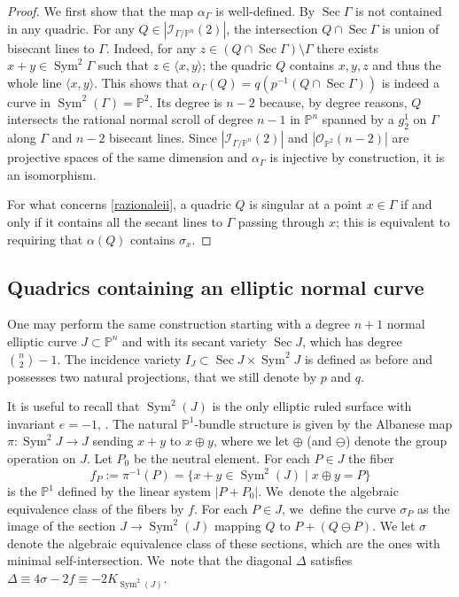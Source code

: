 \documentclass[JEP,XML,SOM,Unicode,NoEqCountersInSection,published]{cedram}
\theoremstyle{plain}
\theoremstyle{definition}
\DeclareMathOperator{\Sec}{Sec}
\DeclareMathOperator{\Sym}{Sym}
\newcommand\PP{{\mathbb P}}
\newcommand\I{{\mathcal I}}
\let\+\oplus
\begin{document}
\begin{proof}
We first show that the map $\alpha_\Gamma$ is well-defined. By \cite{Ca} $\Sec\Gamma$ is not contained in any quadric. For any $Q\in |\I_{\Gamma/\PP^n}(2)|$, the intersection $Q\cap \Sec\Gamma$ is union of bisecant lines to $\Gamma$. Indeed, for any $z\in (Q\cap \Sec \Gamma)\setminus \Gamma$ there exists $x+y\in \Sym^2\Gamma$ such that $z\in \langle x,y\rangle$; the quadric $Q$ contains $x,y,z$ and thus the whole line $\langle x,y\rangle$. This shows that $\alpha_\Gamma (Q)=q(p^{-1}(Q\cap\Sec \Gamma))$ is indeed a curve in $\Sym^2(\Gamma)=\PP^2$. Its degree is $n-2$ because, by degree reasons, $Q$ intersects the rational normal scroll of degree $n-1$ in $\PP^n$ spanned by a $g^1_2$ on $\Gamma$ along $\Gamma$ and $n-2$ bisecant lines. Since $|\I_{\Gamma/\PP^n}(2)|$ and $|\mathcal O_{\PP^2}(n-2)|$ are projective spaces of the same dimension and $\alpha_\Gamma$ is injective by construction, it is an isomorphism.

For what concerns \eqref{razionaleii}, a quadric $Q$ is singular at a point $x\in \Gamma$ if and only if it contains all the secant lines to $\Gamma$ passing through $x$; this is equivalent to requiring that $\alpha(Q)$ contains $\sigma _x$.
\end{proof}

\subsection{Quadrics containing an elliptic normal curve}

One may perform the same construction starting with a degree $n+1$ normal elliptic curve $J\subset \PP^n$ and with its secant variety $\Sec J$, which has degree $\binom{n}{2} -1$. The incidence variety \hbox{$I_J\subset \Sec J\times \Sym^2J$} is defined as before and possesses two natural projections, that we still denote by $p$ and $q$.

It is useful to recall that $\Sym^2(J)$ is the only elliptic ruled surface with invariant $e=-1$, \cf \eg \cite{CaCi}. The natural $\PP^1$-bundle structure is given by the Albanese map $\pi: \Sym^2 J \to J$ sending $x+y$ to $x\+ y$, where we let $\+$ (and $\ominus$) denote the group operation on $J$. Let $P_0$ be the neutral element. For each $P \in J$ the fiber
\[
 f_P:=\pi^{-1}(P)=\{ x+y \in \Sym^2(J) \mid x\+ y=P\}
\]
is the $\PP^1$ defined by the linear system $|P+P_0|$. We~denote the algebraic equivalence class of the fibers by $f$.
For each $P \in J$, we~define the curve $\sigma_P$
as the image of the section $J \to \Sym^2(J)$ mapping $Q$ to $P+ (Q \ominus P)$.
We let $\sigma$ denote the algebraic equivalence class of these sections, which are the ones with minimal self-intersection. We~note that the diagonal $\Delta$ satisfies $\Delta \equiv 4\sigma-2f\equiv -2K_{\Sym^2(J)}$.
\end{document}
